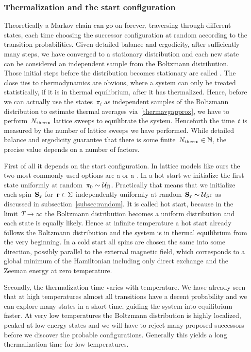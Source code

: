 \subsubsection{Thermalization and the start configuration}

Theoretically a Markov chain can go on forever, traversing through different
states, each time choosing the successor configuration at random according to
the transition probabilities. Given detailed balance and ergodicity, after
sufficiently many steps, we have converged to a stationary distribution and each
new state can be considered an independent sample from the Boltzmann
distribution. Those initial steps before the distribution becomes stationary are
called . The close ties to thermodynamics are obvious,
where a system can only be treated statistically, if it is in thermal
equilibrium, \ie{} after it has thermalized. Hence, before we can actually use
the states~$\pi_i$ as independent samples of the Boltzmann distribution to
estimate thermal averages via~\eqref{thermavgapprox}, we have to
perform~$N_{\mathrm{therm}}$ lattice sweeps to equilibrate the system. Henceforth the
time~$t$ is measured by the number of lattice sweeps we have performed. While
detailed balance and ergodicity guarantee that there is some finite~$N_{\mathrm{therm}} \in
\mathbb{N}$, the precise value depends on a number of factors.

First of all it depends on the start configuration. In lattice models like ours
the two most commonly used options are a  or a . In a hot start we initialize the first state uniformly at random~$\pi_0
\sim \mathcal{U}_{\Pi}$. Practically that means that we initialize each spin~$\mathbf{S}_{\mathbf{r}}$
for~$\mathbf{r} \in \Sigma$ independently uniformly at random~$\mathbf{S}_{\mathbf{r}} \sim \mathcal{U}_{S^2}$
as discussed in subsection~\ref{subsec:random}. It is called hot start, because
in the limit~$T\to \infty$ the Boltzmann distribution becomes a uniform
distribution and each state is equally likely. Hence at infinite temperature a
hot start already follows the Boltzmann distribution and the system is in
thermal equilibrium from the very beginning. In a cold start all spins are
chosen the same into some direction, possibly parallel to the external magnetic
field, which corresponds to a global minimum of the Hamiltonian including only
direct exchange and the Zeeman energy at zero temperature.

Secondly, the thermalization time varies with temperature. We have already seen
that at high temperatures almost all transitions have a decent probability and
we can explore many states in a short time, guiding the system into equilibrium
faster. At very low temperatures the Boltzmann distribution is highly localized,
peaked at low energy states and we will have to reject many proposed successors
before we discover the probable configurations. Generally this yields a long
thermalization time for low temperatures.

